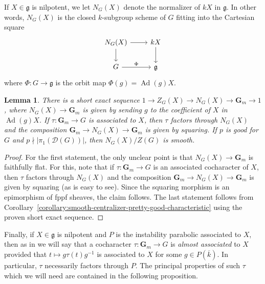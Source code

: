 \documentclass[11pt,reqno]{amsart}
\newtheorem{lemma}[theorem]{Lemma}
\theoremstyle{definition}
\newcommand{\bG}{{\mathbf G}}
\newcommand{\sD}{{\mathscr D}}
\newcommand{\fg}{\mathfrak{g}}
\DeclareMathOperator{\Ad}{Ad}
\begin{document}
If $X \in \fg$ is nilpotent, we let $N_G(X)$ denote the normalizer of $kX$ in $\fg$. In other words, $N_G(X)$ is the closed $k$-subgroup scheme of $G$ fitting into the Cartesian square
\begin{equation}\label{equation:normalizer-scheme}
\begin{tikzcd}
N_G(X) \arrow[r] \arrow[d]
    &kX \arrow[d] \\
G \arrow[r, "\Phi"]
    &\fg
\end{tikzcd}
\end{equation}
where $\Phi: G \to \fg$ is the orbit map $\Phi(g) = \Ad(g)X$.

\begin{lemma}\label{lemma:normalizer-scheme}
There is a short exact sequence $1 \to Z_G(X) \to N_G(X) \to \bG_m \to 1$, where $N_G(X) \to \bG_m$ is given by sending $g$ to the coefficient of $X$ in $\Ad(g)X$. If $\tau: \bG_m \to G$ is associated to $X$, then $\tau$ factors through $N_G(X)$ and the composition $\bG_m \to N_G(X) \to \bG_m$ is given by squaring. If $p$ is good for $G$ and $p \nmid |\pi_1(\sD(G))|$, then $N_G(X)/Z(G)$ is smooth.
\end{lemma}

\begin{proof}
For the first statement, the only unclear point is that $N_G(X) \to \bG_m$ is faithfully flat. For this, note that if $\tau: \bG_m \to G$ is an associated cocharacter of $X$, then $\tau$ factors through $N_G(X)$ and the composition $\bG_m \to N_G(X) \to \bG_m$ is given by squaring (as is easy to see). Since the squaring morphism is an epimorphism of fppf sheaves, the claim follows. The last statement follows from Corollary~\ref{corollary:smooth-centralizer-pretty-good-characteristic} using the proven short exact sequence.
\end{proof}

Finally, if $X \in \fg$ is nilpotent and $P$ is the instability parabolic associated to $X$, then as in \cite[4.3]{McNinch-relative-centralizer} we will say that a cocharacter $\tau: \bG_m \to G$ is \textit{almost associated} to $X$ provided that $t \mapsto g\tau(t)g^{-1}$ is associated to $X$ for some $g \in P(\overline{k})$. In particular, $\tau$ necessarily factors through $P$. The principal properties of such $\tau$ which we will need are contained in the following proposition.
\end{document}
